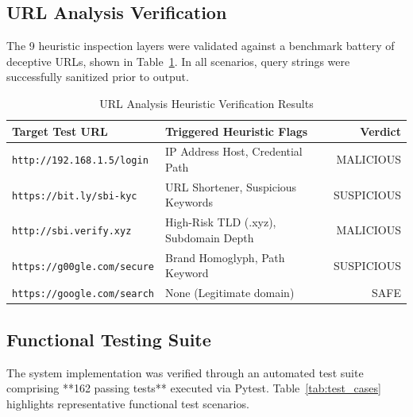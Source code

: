 \documentclass[conference]{IEEEtran}
\providecommand{\toprule}{\hline\hline}
\providecommand{\midrule}{\hline}
\providecommand{\bottomrule}{\hline\hline}
\begin{document}
\subsection{URL Analysis Verification}
The 9 heuristic inspection layers were validated against a benchmark battery of deceptive URLs, shown in Table~\ref{tab:url_tests}. In all scenarios, query strings were successfully sanitized prior to output.

\begin{table}[h]
\caption{URL Analysis Heuristic Verification Results}
\label{tab:url_tests}
\centering
\small
\begin{tabular}{lp{3.5cm}r}
\toprule
\textbf{Target Test URL} & \textbf{Triggered Heuristic Flags} & \textbf{Verdict} \\
\midrule
\texttt{http://192.168.1.5/login} & IP Address Host, Credential Path & MALICIOUS \\
\texttt{https://bit.ly/sbi-kyc} & URL Shortener, Suspicious Keywords & SUSPICIOUS \\
\texttt{http://sbi.verify.xyz} & High-Risk TLD (.xyz), Subdomain Depth & MALICIOUS \\
\texttt{https://g00gle.com/secure} & Brand Homoglyph, Path Keyword & SUSPICIOUS \\
\texttt{https://google.com/search} & None (Legitimate domain) & SAFE \\
\bottomrule
\end{tabular}
\end{table}

\subsection{Functional Testing Suite}
The system implementation was verified through an automated test suite comprising **162 passing tests** executed via Pytest. Table~\ref{tab:test_cases} highlights representative functional test scenarios.
\end{document}
